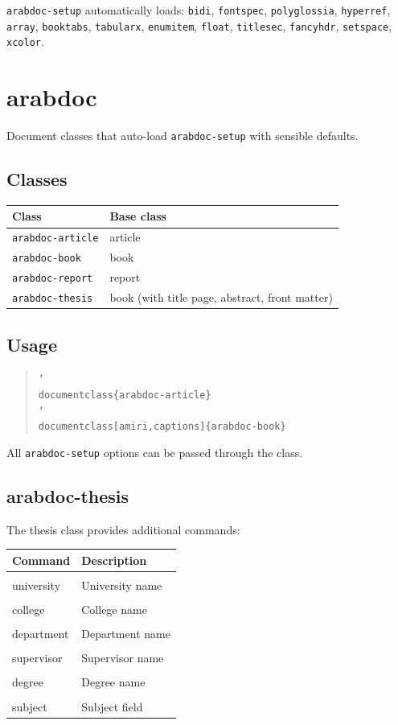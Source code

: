 \documentclass[11pt,a4paper]{ltxdoc}
\newcommand{\cmd}[1]{\textcolor{blue}{\texttt{\char`\\#1}}}
\newcommand{\pkg}[1]{\texttt{#1}}
\begin{document}
\pkg{arabdoc-setup} automatically loads: \pkg{bidi}, \pkg{fontspec}, \pkg{polyglossia}, \pkg{hyperref}, \pkg{array}, \pkg{booktabs}, \pkg{tabularx}, \pkg{enumitem}, \pkg{float}, \pkg{titlesec}, \pkg{fancyhdr}, \pkg{setspace}, \pkg{xcolor}.

\section{arabdoc}

Document classes that auto-load \pkg{arabdoc-setup} with sensible defaults.

\subsection{Classes}

\begin{longtable}{ll}
\toprule
\textbf{Class} & \textbf{Base class} \\
\midrule
\pkg{arabdoc-article} & article \\
\pkg{arabdoc-book} & book \\
\pkg{arabdoc-report} & report \\
\pkg{arabdoc-thesis} & book (with title page, abstract, front matter) \\
\bottomrule
\end{longtable}

\subsection{Usage}

\begin{quote}
\texttt{\char`\\documentclass\{arabdoc-article\}}\\
\texttt{\char`\\documentclass[amiri,captions]\{arabdoc-book\}}
\end{quote}

All \pkg{arabdoc-setup} options can be passed through the class.

\subsection{arabdoc-thesis}

The thesis class provides additional commands:

\begin{longtable}{ll}
\toprule
\textbf{Command} & \textbf{Description} \\
\midrule
\cmd{university}\{...\} & University name \\
\cmd{college}\{...\} & College name \\
\cmd{department}\{...\} & Department name \\
\cmd{supervisor}\{...\} & Supervisor name \\
\cmd{degree}\{...\} & Degree name \\
\cmd{subject}\{...\} & Subject field \\
\bottomrule
\end{longtable}
\end{document}
